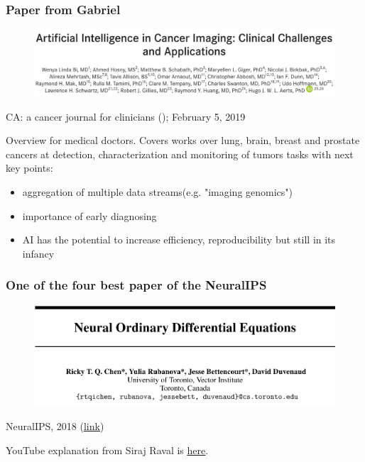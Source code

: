 \documentclass{beamer}
\begin{document}
\begin{frame}
\frametitle{Paper from Gabriel}
\begin{figure}
	\centering
	\includegraphics[width=1.05\textwidth]{images/paper_02_name.png}
	\label{fig:full_process}
\end{figure}
CA: a cancer journal for clinicians (\href{https://onlinelibrary.wiley.com/doi/full/10.3322/caac.21552}{}); February 5, 2019


Overview for medical doctors. Covers works over lung, brain, breast and prostate cancers at detection, characterization and monitoring of tumors tasks with next key points:
\begin{itemize}
	\item aggregation of multiple data streams(e.g. "imaging genomics")
	\item importance of early diagnosing
	\item AI has the potential to increase efficiency, reproducibility but still in its infancy
\end{itemize}
\end{frame}


\begin{frame}
\frametitle{One of the four best paper of the NeuralIPS}
\begin{figure}
	\centering
	\includegraphics[width=\textwidth]{images/neural_ordinary_differential_equations.png}
\end{figure}
NeuralIPS, 2018 (\href{https://arxiv.org/abs/1806.07366}{{\color{blue}\underline{link}}})


YouTube explanation from Siraj Raval is \href{https://www.youtube.com/watch?v=AD3K8j12EIE}{{\color{blue}\underline{here}}}.
\end{frame}
\end{document}
